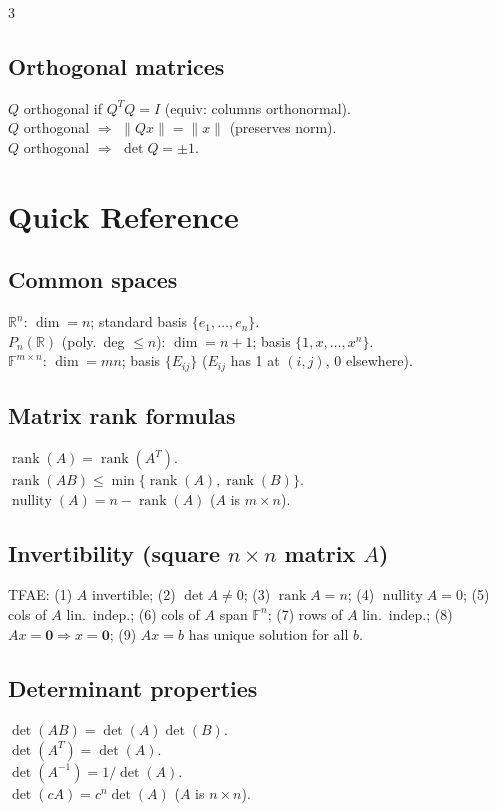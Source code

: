 \documentclass[10pt]{article}
\newcommand{\R}{\mathbb{R}}
\newcommand{\F}{\mathbb{F}}
\newcommand{\rank}{\operatorname{rank}}
\newcommand{\nullity}{\operatorname{nullity}}
\begin{document}
\begin{multicols}{3}
\subsection*{Orthogonal matrices}
$Q$ orthogonal if $Q^TQ=I$ (equiv: columns orthonormal).\\
$Q$ orthogonal $\Rightarrow$ $\|Qx\|=\|x\|$ (preserves norm).\\
$Q$ orthogonal $\Rightarrow$ $\det Q=\pm1$.

\section*{Quick Reference}

\subsection*{Common spaces}
$\R^n$: $\dim=n$; standard basis $\{e_1,\ldots,e_n\}$.\\
$P_n(\R)$ (poly.\ deg $\le n$): $\dim=n+1$; basis $\{1,x,\ldots,x^n\}$.\\
$\F^{m\times n}$: $\dim=mn$; basis $\{E_{ij}\}$ ($E_{ij}$ has 1 at $(i,j)$, 0 elsewhere).

\subsection*{Matrix rank formulas}
$\rank(A)=\rank(A^T)$.\\
$\rank(AB)\le\min\{\rank(A),\rank(B)\}$.\\
$\nullity(A)=n-\rank(A)$ ($A$ is $m\times n$).

\subsection*{Invertibility (square $n\times n$ matrix $A$)}
TFAE: (1) $A$ invertible; (2) $\det A\neq0$; (3) $\rank A=n$; (4) $\nullity A=0$; (5) cols of $A$ lin.\ indep.; (6) cols of $A$ span $\F^n$; (7) rows of $A$ lin.\ indep.; (8) $Ax=\bm{0}\Rightarrow x=\bm{0}$; (9) $Ax=b$ has unique solution for all $b$.

\subsection*{Determinant properties}
$\det(AB)=\det(A)\det(B)$.\\
$\det(A^T)=\det(A)$.\\
$\det(A^{-1})=1/\det(A)$.\\
$\det(cA)=c^n\det(A)$ ($A$ is $n\times n$).


\end{multicols}
\end{document}
